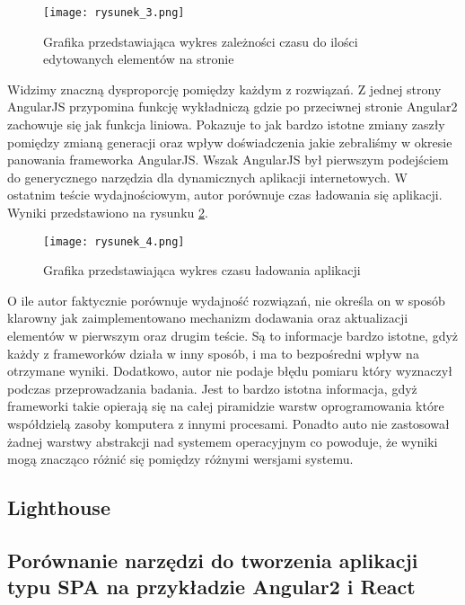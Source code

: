 \begin{figure}[!ht]
    \centering
    \texttt{[image: rysunek\_3.png]}
    \caption{Grafika przedstawiająca wykres zależności czasu do ilości edytowanych elementów na stronie \cite{Molin}}
    \label{fig:rysunek_3}
\end{figure}

Widzimy znaczną dysproporcję pomiędzy każdym z rozwiązań. Z jednej strony AngularJS przypomina funkcję wykładniczą gdzie po przeciwnej stronie Angular2 zachowuje się jak funkcja liniowa. Pokazuje to jak bardzo istotne zmiany zaszły pomiędzy zmianą generacji oraz wpływ doświadczenia jakie zebraliśmy w okresie panowania frameworka AngularJS. Wszak AngularJS był pierwszym podejściem do generycznego narzędzia dla dynamicznych aplikacji internetowych.
W ostatnim teście wydajnościowym, autor porównuje czas ładowania się aplikacji. Wyniki przedstawiono na rysunku \ref{fig:rysunek_4}.

\begin{figure}[!ht]
    \centering
    \texttt{[image: rysunek\_4.png]}
    \caption{Grafika przedstawiająca wykres czasu ładowania aplikacji \cite{Molin}}
    \label{fig:rysunek_4}
\end{figure}

O ile autor faktycznie porównuje wydajność rozwiązań, nie określa on w sposób klarowny jak zaimplementowano mechanizm dodawania oraz aktualizacji elementów w pierwszym oraz drugim teście.
Są to informacje bardzo istotne, gdyż każdy z frameworków działa w inny sposób, i ma to bezpośredni wpływ na otrzymane wyniki.
Dodatkowo, autor nie podaje błędu pomiaru \cite{probalistyka} który wyznaczył podczas przeprowadzania badania.
Jest to bardzo istotna informacja, gdyż frameworki takie opierają się na całej piramidzie warstw oprogramowania które współdzielą zasoby komputera z innymi procesami.
Ponadto auto nie zastosował żadnej warstwy abstrakcji nad systemem operacyjnym co powoduje, że wyniki mogą znacząco różnić się pomiędzy różnymi wersjami systemu.

\subsection{Lighthouse}



\subsection{Porównanie narzędzi do tworzenia aplikacji typu SPA na przykładzie Angular2 i React}
